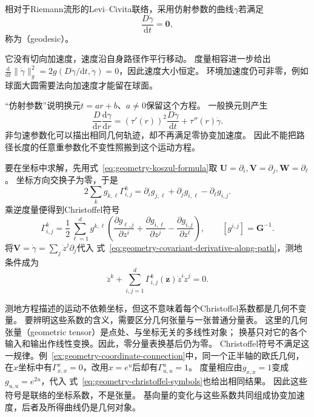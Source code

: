 \begin{definition}[测地线]
\label{def:geometry-geodesic}
相对于Riemann流形的Levi--Civita联络，采用仿射参数的曲线$\gamma$若满足
\[
 \frac{D\dot\gamma}{\mathrm dt}=\bm0,
\]
称为（geodesic）。
\end{definition}
它没有切向加速度，速度沿自身路径作平行移动。
度量相容进一步给出
$\frac{\mathrm d}{\mathrm dt}\lVert\dot\gamma\rVert_g^2
=2g(D\dot\gamma/\mathrm dt,\dot\gamma)=0$，因此速度大小恒定。
环境加速度仍可非零，例如球面大圆需要法向加速度才能留在球面。

“仿射参数”说明换元$t=ar+b$、$a\neq0$保留这个方程。
一般换元则产生
\[
 \frac{D}{\mathrm dr}\frac{\mathrm d\gamma}{\mathrm dr}
 =(\tau'(r))^2\frac{D\dot\gamma}{\mathrm dt}
   +\tau''(r)\dot\gamma.
\]
非匀速参数化可以描出相同几何轨迹，却不再满足零协变加速度。
因此不能把路径长度的任意重参数化不变性照搬到这个运动方程。

要在坐标中求解，先用式~\eqref{eq:geometry-koszul-formula}取
$\bm U=\partial_i,\bm V=\partial_j,\bm W=\partial_\ell$。
坐标方向交换子为零，于是
\[
 2\sum_k g_{k,\ell}\Gamma^k_{i,j}
 =\partial_i g_{j,\ell}+\partial_j g_{i,\ell}-\partial_\ell g_{i,j}.
\]
乘逆度量便得到Christoffel符号
\begin{equation}
 \Gamma^k_{i,j}
 =\frac12\sum_{\ell=1}^d g^{k,\ell}
  \left(\frac{\partial g_{\ell,j}}{\partial z^i}
       +\frac{\partial g_{i,\ell}}{\partial z^j}
       -\frac{\partial g_{i,j}}{\partial z^\ell}\right),
 \qquad [g^{i,j}]=\bm G^{-1}.
 \label{eq:geometry-christoffel-symbols}
\end{equation}
将$\bm V=\dot\gamma=\sum_j\dot z^j\partial_j$代入
式~\eqref{eq:geometry-covariant-derivative-along-path}，测地条件成为
\begin{equation}
 \ddot z^k+\sum_{i,j=1}^d
 \Gamma^k_{i,j}(\bm z)\dot z^i\dot z^j=0.
 \label{eq:geometry-geodesic-equation}
\end{equation}

测地方程描述的运动不依赖坐标，但这不意味着每个Christoffel系数都是几何不变量。
要辨明这些系数的含义，需要区分几何张量与一张普通分量表。
这里的几何张量（geometric tensor）是点处、与坐标无关的多线性对象；
换基只对它的各个输入和输出作线性变换。因此，零分量表换基后仍为零。
Christoffel符号不满足这一规律。例~\ref{ex:geometry-coordinate-connection}中，同一个正半轴的欧氏几何，
在$x$坐标中有$\Gamma^x_{x,x}=0$，改用$x=e^u$后却有$\Gamma^u_{u,u}=1$。
度量相应由$g_{x,x}=1$变成$g_{u,u}=e^{2u}$，代入
式~\eqref{eq:geometry-christoffel-symbols}也给出相同结果。
因此这些符号是联络的坐标系数，不是张量。
基向量的变化与这些系数共同组成协变加速度，后者及所得曲线仍是几何对象。

